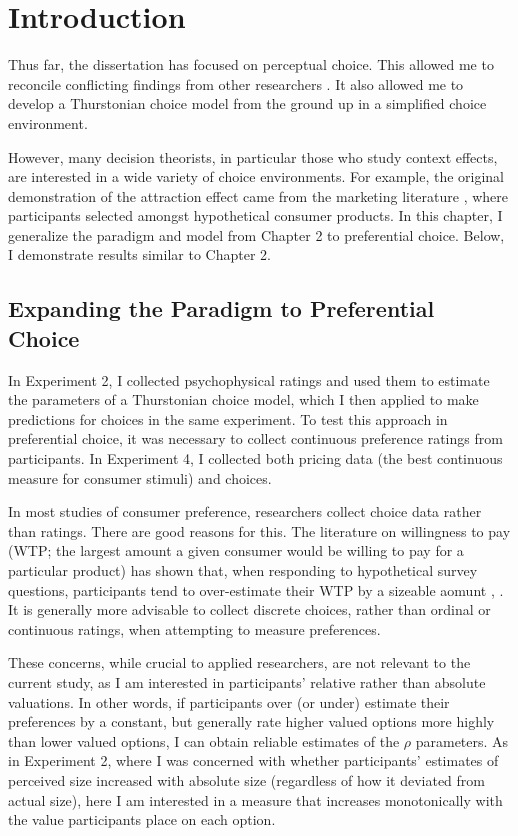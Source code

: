 \section{Introduction}
Thus far, the dissertation has focused on perceptual choice. This allowed me to reconcile conflicting findings from other researchers \parencite{spektorWhenGoodLooks2018b,trueblood2013not}. It also allowed me to develop a Thurstonian choice model from the ground up in a simplified choice environment. 

However, many decision theorists, in particular those who study context effects, are interested in a wide variety of choice environments. For example, the original demonstration of the attraction effect came from the marketing literature \parencite{huberAddingAsymmetricallyDominated1982d}, where participants selected amongst hypothetical consumer products. In this chapter, I generalize the paradigm and model from Chapter 2 to preferential choice. Below, I demonstrate results similar to Chapter 2.

\subsection{Expanding the Paradigm to Preferential Choice}

In Experiment 2, I collected psychophysical ratings and used them to estimate the parameters of a Thurstonian choice model, which I then applied to make predictions for choices in the same experiment. To test this approach in preferential choice, it was necessary to collect continuous preference ratings from participants. In Experiment 4, I collected both pricing data (the best continuous measure for consumer stimuli) and choices.

In most studies of consumer preference, researchers collect choice data rather than ratings. There are good reasons for this. The literature on willingness to pay (WTP; the largest amount a given consumer would be willing to pay for a particular product) has shown that, when responding to hypothetical survey questions, participants tend to over-estimate their WTP by a sizeable aomunt \parencite{breidertREVIEWMETHODSMEASURING2006,schmidtAccuratelyMeasuringWillingness2020}, \parencite[c.f.~]{miller2011should}. It is generally more advisable to collect discrete choices, rather than ordinal or continuous ratings, when attempting to measure preferences.

These concerns, while crucial to applied researchers, are not relevant to the current study, as I am interested in participants' relative rather than absolute valuations. In other words, if participants over (or under) estimate their preferences by a constant, but generally rate higher valued options more highly than lower valued options, I can obtain reliable estimates of the $\rho$ parameters. As in Experiment 2, where I was concerned with whether participants' estimates of perceived size increased with absolute size (regardless of how it deviated from actual size), here I am interested in a measure that increases monotonically with the value participants place on each option. 

